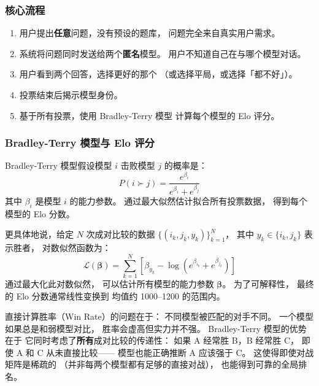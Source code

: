 \subsubsection{核心流程}

\begin{enumerate}[noitemsep]
  \item 用户提出\textbf{任意}问题，没有预设的题库，
        问题完全来自真实用户需求。
  \item 系统将问题同时发送给两个\textbf{匿名}模型。
        用户不知道自己在与哪个模型对话。
  \item 用户看到两个回答，选择更好的那个
        （或选择平局，或选择「都不好」）。
  \item 投票结束后揭示模型身份。
  \item 基于所有投票，使用 Bradley-Terry 模型
        计算每个模型的 Elo 评分。
\end{enumerate}

\subsubsection{Bradley-Terry 模型与 Elo 评分}

Bradley-Terry 模型假设模型 $i$ 击败模型 $j$ 的概率是：
\begin{equation}
  P(i \succ j) = \frac{e^{\beta_i}}{e^{\beta_i} + e^{\beta_j}}
  \label{eq:bt-model}
\end{equation}
其中 $\beta_i$ 是模型 $i$ 的能力参数。
通过最大似然估计拟合所有投票数据，
得到每个模型的 Elo 分数。

更具体地说，给定 $N$ 次成对比较的数据
$\{(i_k, j_k, y_k)\}_{k=1}^{N}$，
其中 $y_k \in \{i_k, j_k\}$ 表示胜者，
对数似然函数为：
\begin{equation}
  \mathcal{L}(\boldsymbol{\beta}) = \sum_{k=1}^{N}
  \left[\beta_{y_k} - \log\left(e^{\beta_{i_k}} + e^{\beta_{j_k}}\right)\right]
  \label{eq:bt-loglik}
\end{equation}
通过最大化此对数似然，
可以估计所有模型的能力参数 $\boldsymbol{\beta}$。
为了可解释性，
最终的 Elo 分数通常线性变换到
均值约 1000--1200 的范围内。

\begin{whybox}
直接计算胜率（Win Rate）的问题在于：
不同模型被匹配的对手不同。
一个模型如果总是和弱模型对比，
胜率会虚高但实力并不强。
Bradley-Terry 模型的优势在于
它同时考虑了\textbf{所有}成对比较的传递性：
如果 A 经常胜 B，B 经常胜 C，
即使 A 和 C 从未直接比较——
模型也能正确推断 A 应该强于 C。
这使得即使对战矩阵是稀疏的
（并非每两个模型都有足够的直接对战），
也能得到可靠的全局排名。
\end{whybox}

